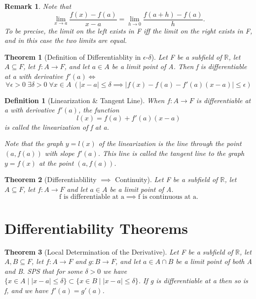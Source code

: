 \documentclass[11pt, oneside]{book}
\theoremstyle{break}
\newtheorem{thm}{Theorem}[section]
\newtheorem*{remark}{Remark}
\newtheorem{defn}{Definition}[section]
\newcommand{\bb}[1]{\mathbb{#1}}			%
\begin{document}
\begin{remark}
	Note that
	\[
		\lim_{x \to a} \frac{f(x) - f(a)}{x - a} = \lim_{h \to 0} \frac{f(a + h) - f(a)}{h}.
	\]
	To be precise, the limit on the left exists in F iff the limit on the right exists in F, and in this case the two limits are equal.
\end{remark}

\begin{thm}[Definition of Differentiablity in $\epsilon$-$\delta$]
	Let F be a subfield of $\bb{R}$, let $A \subseteq F$, let $f: A \to F$, and let $a \in A$ be a limit point of A. Then f is differentiable at a with derivative $f'(a) \iff$
	\[
		\forall \epsilon > 0 \; \exists \delta > 0 \; \forall x \in A \; (|x - a| \leq \delta \implies |f(x) - f(a) - f'(a)(x-a)| \leq \epsilon)
	\]
\end{thm}

\begin{defn}[Linearization \& Tangent Line]
	When $f: A \to F$ is differentiable at a with derivative $f'(a)$, the function
	\[
		l(x) = f(a) + f'(a)(x-a)
	\]
	is called the linearization of f at a.

	Note that the graph $y = l(x)$ of the linearization is the line through the point $(a, f(a))$ with slope $f'(a)$. This line is called the tangent line to the graph $y = f(x)$ at the point $(a, f(a))$.
\end{defn}

\begin{thm}[Differentiablility $\implies$ Continuity]
	Let F be a subfield of $\bb{R}$, let $A \subseteq F$, let $f: A \to F$ and let $a \in A$ be a limit point of A.
	\[
		\text{f is differentiable at a} \implies \text{f is continuous at a}.
	\]
\end{thm}


\section{Differentiability Theorems}

\begin{thm}[Local Determination of the Derivative]
	Let F be a subfield of $\bb{R}$, let $A, B \subseteq F$, let $f: A \to F$ and $g:B \to F$, and let $a \in A \cap B$ be a limit point of both A and B. SPS that for some $\delta > 0$ we have $\{ x \in A \; | \; |x - a| \leq \delta \} \subset \{x \in B \; | \; |x - a| \leq \delta\}$. If g is differentiable at a then so is f, and we have $f'(a) = g'(a)$.
\end{thm}
\end{document}
